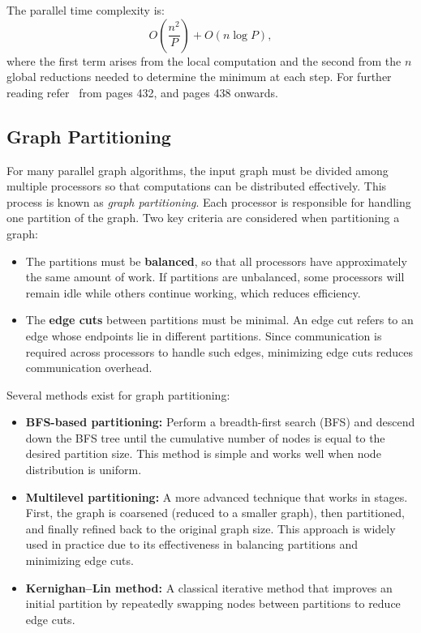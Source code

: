\documentclass[12pt]{book}
\begin{document}
The parallel time complexity is:
\[
O\left(\frac{n^2}{P}\right) + O(n \log P),
\]
where the first term arises from the local computation and the second from the $n$ global reductions needed to determine the minimum at each step. For further reading refer~\cite{kumar1994introduction} from pages 432, and pages 438 onwards.


\subsection{Graph Partitioning} 
For many parallel graph algorithms, the input graph must be divided among multiple processors so that computations can be distributed effectively. This process is known as \emph{graph partitioning}. Each processor is responsible for handling one partition of the graph. Two key criteria are considered when partitioning a graph:
\begin{itemize}
    \item The partitions must be \textbf{balanced}, so that all processors have approximately the same amount of work. If partitions are unbalanced, some processors will remain idle while others continue working, which reduces efficiency.
    \item The \textbf{edge cuts} between partitions must be minimal. An edge cut refers to an edge whose endpoints lie in different partitions. Since communication is required across processors to handle such edges, minimizing edge cuts reduces communication overhead.
\end{itemize}

Several methods exist for graph partitioning:
\begin{itemize}
    \item \textbf{BFS-based partitioning:} Perform a breadth-first search (BFS) and descend down the BFS tree until the cumulative number of nodes is equal to the desired partition size. This method is simple and works well when node distribution is uniform.
    \item \textbf{Multilevel partitioning:} A more advanced technique that works in stages. First, the graph is coarsened (reduced to a smaller graph), then partitioned, and finally refined back to the original graph size. This approach is widely used in practice due to its effectiveness in balancing partitions and minimizing edge cuts.
    \item \textbf{Kernighan–Lin method:} A classical iterative method that improves an initial partition by repeatedly swapping nodes between partitions to reduce edge cuts.
\end{itemize}
\end{document}
